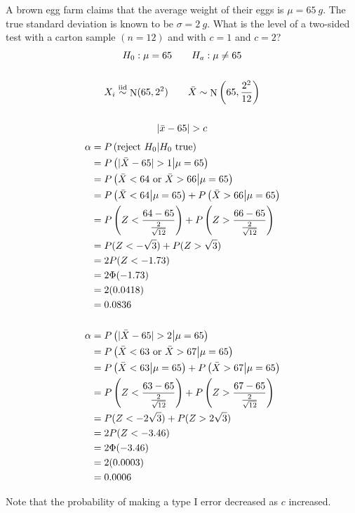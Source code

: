 \documentclass[letterpaper,12pt,fleqn]{article}
\newcommand{\m}{\mu}
\renewcommand{\o}{\sigma}
\renewcommand{\P}{\Phi}
\renewcommand{\a}{\alpha}
\newcommand{\iid}{\overset{\text{iid}}{\sim}}
\newcommand{\cond}[2]{P\left({#1}\middle\vert{#2}\right)}
\DeclareMathOperator{\nd}{N}
\begin{document}
\begin{example}
  A brown egg farm claims that the average weight of their eggs is \(\m=\SI{65}{g}\).  The true standard deviation is known
  to be \(\o=\SI{2}{g}\).  What is the level of a two-sided test with a carton sample \((n=12)\) and with \(c=1\) and \(c=2\)?
  \begin{gather*}
    H_0:\m=65\qquad H_a:\m\ne65 \\
    \\
    X_i\iid\nd(65,2^2)\qquad\bar{X}\sim\nd\left(65,\frac{2^2}{12}\right) \\
    \\
    \abs{\bar{x}-65}>c
  \end{gather*}
  \begin{align*}
    \a &= \cond{\text{reject}\ H_0}{H_0\ \text{true}} \\
    &= \cond{\abs{\bar{X}-65}>1}{\m=65} \\
    &= \cond{\bar{X}<64\ \text{or}\ \bar{X}>66}{\m=65} \\
    &= \cond{\bar{X}<64}{\m=65}+\cond{\bar{X}>66}{\m=65} \\
    &= P\left(Z<\frac{64-65}{\frac{2}{\sqrt{12}}}\right)+P\left(Z>\frac{66-65}{\frac{2}{\sqrt{12}}}\right) \\
    &= P(Z<-\sqrt{3})+P(Z>\sqrt{3}) \\
    &= 2P(Z<-1.73) \\
    &= 2\P(-1.73) \\
    &= 2(0.0418) \\
    &= 0.0836 \\
    \\
    \a &= \cond{\abs{\bar{X}-65}>2}{\m=65} \\
    &= \cond{\bar{X}<63\ \text{or}\ \bar{X}>67}{\m=65} \\
    &= \cond{\bar{X}<63}{\m=65}+\cond{\bar{X}>67}{\m=65} \\
    &= P\left(Z<\frac{63-65}{\frac{2}{\sqrt{12}}}\right)+P\left(Z>\frac{67-65}{\frac{2}{\sqrt{12}}}\right) \\
    &= P(Z<-2\sqrt{3})+P(Z>2\sqrt{3}) \\
    &= 2P(Z<-3.46) \\
    &= 2\P(-3.46) \\
    &= 2(0.0003) \\
    &= 0.0006
  \end{align*}
\end{example}

Note that the probability of making a type I error decreased as \(c\) increased.
\end{document}
